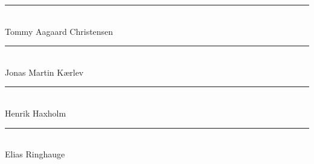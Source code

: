 
\cleardoublepage
\parbox{\textwidth} {
    \vspace{5cm}
    
    \parbox{7cm} {
        \centering
        \rule{6cm}{1pt} \\
        Tommy Aagaard Christensen
    }
    \hfill
    \parbox{7cm} {
        \centering
        \rule{6cm}{1pt} \\
        Jonas Martin Kærlev
    }
    \newline\newline\newline\newline\newline\newline
    \hfill
    \parbox{7cm} {
        \centering
        \rule{6cm}{1pt} \\
        Henrik Haxholm
    }
    \hfill
    \parbox{7cm} {
        \centering
        \rule{6cm}{1pt} \\
        Elias Ringhauge
    }
    \hfill

}
